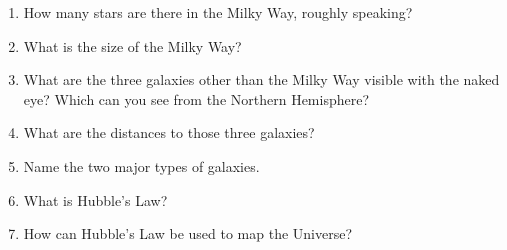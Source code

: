 
\begin{enumerate}
\item How many stars are there in the Milky Way, roughly speaking?
\vspace{80pt}
\item What is the size of the Milky Way?
\vspace{80pt}
\item What are the three galaxies other than the Milky Way visible with
  the naked eye? Which can you see from the Northern Hemisphere?
\vspace{80pt}
\item What are the distances to those three galaxies?
\vspace{80pt}
\item Name the two major types of galaxies.
\vspace{80pt}
\item What is Hubble's Law?
\vspace{80pt}
\item How can Hubble's Law be used to map the Universe?
\vspace{80pt}
\end{enumerate}
